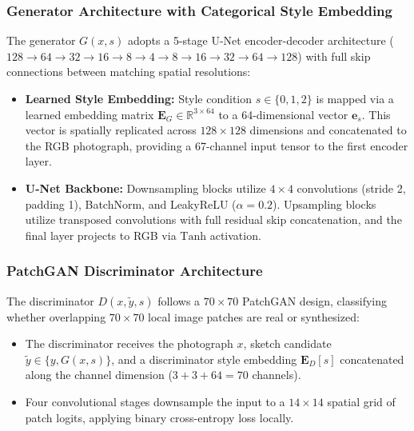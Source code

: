 \documentclass[conference]{IEEEtran}
\begin{document}
\subsubsection{Generator Architecture with Categorical Style Embedding}
The generator $G(x, s)$ adopts a 5-stage U-Net encoder-decoder architecture ($128 \to 64 \to 32 \to 16 \to 8 \to 4 \to 8 \to 16 \to 32 \to 64 \to 128$) with full skip connections between matching spatial resolutions:
\begin{itemize}
    \item \textbf{Learned Style Embedding:} Style condition $s \in \{0, 1, 2\}$ is mapped via a learned embedding matrix $\mathbf{E}_G \in \mathbb{R}^{3 \times 64}$ to a 64-dimensional vector $\mathbf{e}_s$. This vector is spatially replicated across $128 \times 128$ dimensions and concatenated to the RGB photograph, providing a 67-channel input tensor to the first encoder layer.
    \item \textbf{U-Net Backbone:} Downsampling blocks utilize $4 \times 4$ convolutions (stride 2, padding 1), BatchNorm, and LeakyReLU ($\alpha = 0.2$). Upsampling blocks utilize transposed convolutions with full residual skip concatenation, and the final layer projects to RGB via $\text{Tanh}$ activation.
\end{itemize}

\subsubsection{PatchGAN Discriminator Architecture}
The discriminator $D(x, \tilde{y}, s)$ follows a $70 \times 70$ PatchGAN design, classifying whether overlapping $70 \times 70$ local image patches are real or synthesized:
\begin{itemize}
    \item The discriminator receives the photograph $x$, sketch candidate $\tilde{y} \in \{y, G(x, s)\}$, and a discriminator style embedding $\mathbf{E}_D[s]$ concatenated along the channel dimension ($3 + 3 + 64 = 70$ channels).
    \item Four convolutional stages downsample the input to a $14 \times 14$ spatial grid of patch logits, applying binary cross-entropy loss locally.
\end{itemize}
\end{document}
